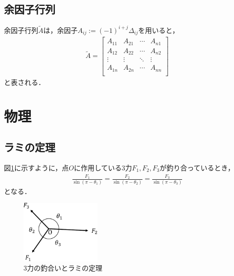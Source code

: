 \documentclass[11pt,a4paper]{jsarticle}
\begin{document}
\subsection{余因子行列}

余因子行列$\tilde{A}$は，余因子$A_{ij}:=(-1)^{i+j}\Delta_{ij}$を用いると，
\begin{align*}
  \tilde{A}=
  \begin{bmatrix}
    A_{11} & A_{21} & \cdots & A_{n1} \\
    A_{12} & A_{22} & \cdots & A_{n2} \\
    \vdots & \vdots & \ddots & \vdots \\
    A_{1n} & A_{2n} & \cdots & A_{nn} \\
  \end{bmatrix}
\end{align*}
と表される．

\section{物理}

\subsection{ラミの定理}

図\ref{fig:lami-s-theorem}に示すように，点$O$に作用している3力$F_1,F_2,F_3$が釣り合っているとき，
\begin{align*}
  \frac{F_1}{\sin(\pi-\theta_1)}=\frac{F_2}{\sin(\pi-\theta_2)}=\frac{F_3}{\sin(\pi-\theta_3)}
\end{align*}
となる．

\begin{figure}[hbtp]\centering
  \includegraphics[width=4cm]{lami-s-theorem.pdf}
  \caption{3力の釣合いとラミの定理}
  \label{fig:lami-s-theorem}
\end{figure}
\end{document}
